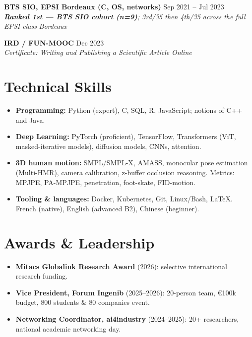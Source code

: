\documentclass[10pt, letterpaper]{article}
\newcommand{\entry}[4]{
  \noindent \textbf{#1} \hfill #2 \\
  \textit{#3} \hfill \textit{#4} \par
}
\begin{document}
\vspace{2pt}

\entry{BTS SIO, EPSI Bordeaux (C, OS, networks)}{Sep 2021 -- Jul 2023}{\textbf{Ranked 1st --- BTS SIO cohort (n=9)}; 3rd/35 then 4th/35 across the full EPSI class}{Bordeaux}

\vspace{2pt}

\entry{IRD / FUN-MOOC}{Dec 2023}{Certificate: \textit{Writing and Publishing a Scientific Article}}{Online}

\section{Technical Skills}
\begin{itemize}
    \item \textbf{Programming:} Python (expert), C, SQL, R, JavaScript; notions of C++ and Java.
    \item \textbf{Deep Learning:} PyTorch (proficient), TensorFlow, Transformers (ViT, masked-iterative models), diffusion models, CNNs, attention.
    \item \textbf{3D human motion:} SMPL/SMPL-X, AMASS, monocular pose estimation (Multi-HMR), camera calibration, z-buffer occlusion reasoning. Metrics: MPJPE, PA-MPJPE, penetration, foot-skate, FID-motion.
    \item \textbf{Tooling \& languages:} Docker, Kubernetes, Git, Linux/Bash, LaTeX. French (native), English (advanced B2), Chinese (beginner).
\end{itemize}

\section{Awards \& Leadership}
\begin{itemize}
    \item \textbf{Mitacs Globalink Research Award} (2026): selective international research funding.
    \item \textbf{Vice President, Forum Ingenib} (2025--2026): 20-person team, \euro 100k budget, 800 students \& 80 companies event.
    \item \textbf{Networking Coordinator, ai4industry} (2024--2025): 20+ researchers, national academic networking day.
\end{itemize}
\end{document}
